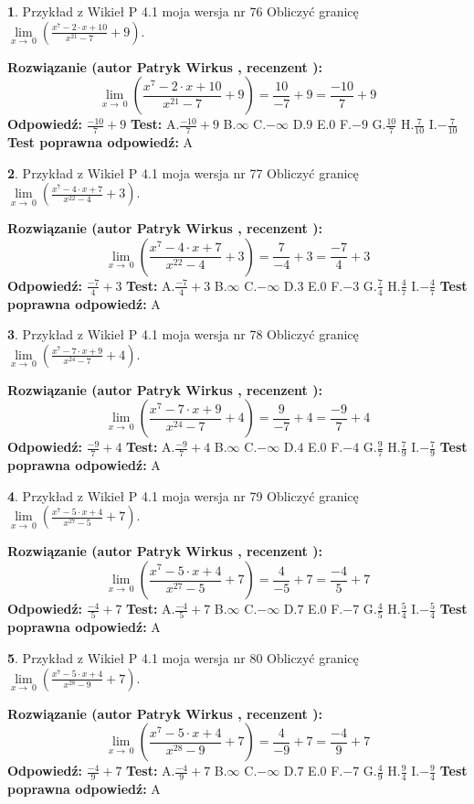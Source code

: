 \documentclass[12pt, a4paper]{article}
\theoremstyle{definition} %
\newtheorem{zad}{}
\newcommand{\zadStart}[1]{\begin{zad}#1\newline}
\newcommand{\zadStop}{\end{zad}}
\newcommand{\rozwStart}[2]{\noindent \textbf{Rozwiązanie (autor #1 , recenzent #2): }\newline}
\newcommand{\rozwStop}{\newline}
\newcommand{\odpStart}{\noindent \textbf{Odpowiedź:}\newline}
\newcommand{\odpStop}{\newline}
\newcommand{\testStart}{\noindent \textbf{Test:}\newline}
\newcommand{\testStop}{\newline}
\newcommand{\kluczStart}{\noindent \textbf{Test poprawna odpowiedź:}\newline}
\newcommand{\kluczStop}{\newline}
\begin{document}
\zadStart{Przykład z Wikieł P 4.1 moja wersja nr 76}
Obliczyć granicę $\lim\limits_{x\to\ 0}(\frac{x^{7}-2 \cdot x +10}{x^{21}-7}+9)$.
\zadStop
\rozwStart{Patryk Wirkus}{}
$$\lim\limits_{x\to\ 0}(\frac{x^{7}-2 \cdot x +10}{x^{21}-7}+9)=\frac{10}{-7}+9=\frac{-10}{7}+9$$
\rozwStop
\odpStart
$\frac{-10}{7}+9$
\odpStop
\testStart
A.$\frac{-10}{7}+9$
B.$\infty$
C.$-\infty$
D.$9$
E.$0$
F.$-9$
G.$\frac{10}{7}$
H.$\frac{7}{10}$
I.$-\frac{7}{10}$
\testStop
\kluczStart
A
\kluczStop



\zadStart{Przykład z Wikieł P 4.1 moja wersja nr 77}
Obliczyć granicę $\lim\limits_{x\to\ 0}(\frac{x^{7}-4 \cdot x +7}{x^{22}-4}+3)$.
\zadStop
\rozwStart{Patryk Wirkus}{}
$$\lim\limits_{x\to\ 0}(\frac{x^{7}-4 \cdot x +7}{x^{22}-4}+3)=\frac{7}{-4}+3=\frac{-7}{4}+3$$
\rozwStop
\odpStart
$\frac{-7}{4}+3$
\odpStop
\testStart
A.$\frac{-7}{4}+3$
B.$\infty$
C.$-\infty$
D.$3$
E.$0$
F.$-3$
G.$\frac{7}{4}$
H.$\frac{4}{7}$
I.$-\frac{4}{7}$
\testStop
\kluczStart
A
\kluczStop



\zadStart{Przykład z Wikieł P 4.1 moja wersja nr 78}
Obliczyć granicę $\lim\limits_{x\to\ 0}(\frac{x^{7}-7 \cdot x +9}{x^{24}-7}+4)$.
\zadStop
\rozwStart{Patryk Wirkus}{}
$$\lim\limits_{x\to\ 0}(\frac{x^{7}-7 \cdot x +9}{x^{24}-7}+4)=\frac{9}{-7}+4=\frac{-9}{7}+4$$
\rozwStop
\odpStart
$\frac{-9}{7}+4$
\odpStop
\testStart
A.$\frac{-9}{7}+4$
B.$\infty$
C.$-\infty$
D.$4$
E.$0$
F.$-4$
G.$\frac{9}{7}$
H.$\frac{7}{9}$
I.$-\frac{7}{9}$
\testStop
\kluczStart
A
\kluczStop



\zadStart{Przykład z Wikieł P 4.1 moja wersja nr 79}
Obliczyć granicę $\lim\limits_{x\to\ 0}(\frac{x^{7}-5 \cdot x +4}{x^{27}-5}+7)$.
\zadStop
\rozwStart{Patryk Wirkus}{}
$$\lim\limits_{x\to\ 0}(\frac{x^{7}-5 \cdot x +4}{x^{27}-5}+7)=\frac{4}{-5}+7=\frac{-4}{5}+7$$
\rozwStop
\odpStart
$\frac{-4}{5}+7$
\odpStop
\testStart
A.$\frac{-4}{5}+7$
B.$\infty$
C.$-\infty$
D.$7$
E.$0$
F.$-7$
G.$\frac{4}{5}$
H.$\frac{5}{4}$
I.$-\frac{5}{4}$
\testStop
\kluczStart
A
\kluczStop



\zadStart{Przykład z Wikieł P 4.1 moja wersja nr 80}
Obliczyć granicę $\lim\limits_{x\to\ 0}(\frac{x^{7}-5 \cdot x +4}{x^{28}-9}+7)$.
\zadStop
\rozwStart{Patryk Wirkus}{}
$$\lim\limits_{x\to\ 0}(\frac{x^{7}-5 \cdot x +4}{x^{28}-9}+7)=\frac{4}{-9}+7=\frac{-4}{9}+7$$
\rozwStop
\odpStart
$\frac{-4}{9}+7$
\odpStop
\testStart
A.$\frac{-4}{9}+7$
B.$\infty$
C.$-\infty$
D.$7$
E.$0$
F.$-7$
G.$\frac{4}{9}$
H.$\frac{9}{4}$
I.$-\frac{9}{4}$
\testStop
\kluczStart
A
\kluczStop
\end{document}
